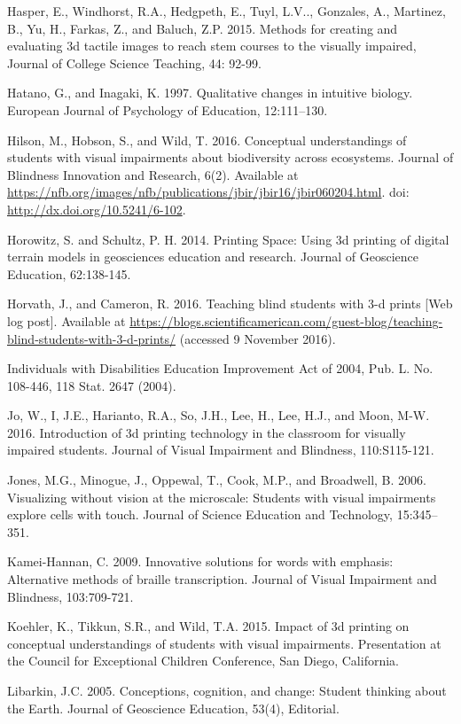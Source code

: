 \documentclass[11.5pt]{sig-alternate} %
\begin{document}
Hasper, E., Windhorst, R.A., Hedgpeth, E., Tuyl, L.V.., Gonzales, A., Martinez, B., Yu, H., Farkas, Z., and Baluch, Z.P. 2015.  Methods for creating and evaluating 3d tactile images to reach stem courses to the visually impaired, Journal of College Science Teaching, 44: 92-99.

Hatano, G., and Inagaki, K. 1997. Qualitative changes in intuitive biology. European Journal of Psychology of Education, 12:111–130.

Hilson, M., Hobson, S., and Wild, T. 2016. Conceptual understandings of students with visual impairments about biodiversity across ecosystems. Journal of Blindness Innovation and Research, 6(2). Available at \url{https://nfb.org/images/nfb/publications/jbir/jbir16/jbir060204.html}. doi: \url{http://dx.doi.org/10.5241/6-102}.

Horowitz, S. and Schultz, P. H.  2014.  Printing Space: Using 3d printing of digital terrain models in geosciences education and research.  Journal of Geoscience Education, 62:138-145.

Horvath, J., and Cameron, R. 2016.  Teaching blind students with 3-d prints [Web log post].  Available at \url{https://blogs.scientificamerican.com/guest-blog/teaching-blind-students-with-3-d-prints/}  (accessed 9 November 2016).

Individuals with Disabilities Education Improvement Act of 2004, Pub. L. No. 108-446, 118 Stat. 2647 (2004).

Jo, W., I, J.E., Harianto, R.A., So, J.H., Lee, H., Lee, H.J., and Moon, M-W. 2016. Introduction of 3d printing technology in the classroom for visually impaired students. Journal of Visual Impairment and Blindness, 110:S115-121. 

Jones, M.G., Minogue, J., Oppewal, T., Cook, M.P., and Broadwell, B. 2006. Visualizing without vision at the microscale:  Students with visual impairments explore cells with touch.  Journal of Science Education and Technology, 15:345–351.

Kamei-Hannan, C. 2009. Innovative solutions for words with emphasis: Alternative methods of braille transcription. Journal of Visual Impairment and Blindness, 103:709-721.

Koehler, K., Tikkun, S.R., and Wild, T.A. 2015.  Impact of 3d printing on conceptual understandings of students with visual impairments. Presentation at the Council for Exceptional Children Conference, San Diego, California.

Libarkin, J.C.  2005.  Conceptions, cognition, and change: Student thinking about the Earth.  Journal of Geoscience Education, 53(4), Editorial.
\end{document}
